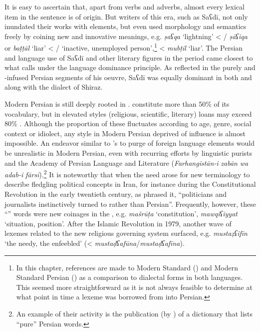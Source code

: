 \documentclass[output=paper]{langsci/langscibook}
\begin{document}
It is easy to ascertain that, apart from verbs and adverbs, almost every lexical item in the sentence is of  origin. But writers of this era, such as Saʕdī, not only inundated their works with  elements, but even used  morphology and semantics freely by coining new and innovative meanings, e.g. \textit{ṣaʕqa} ‘lightning’ < / \textit{ṣāʕiqa} or \textit{baṭṭāl} ‘liar’ < / ‘inactive, unemployed person’,\footnote{In this chapter, references are made to Modern Standard  () and Modern Standard Persian () as a comparison to dialectal forms in both languages. This seemed more straightforward as it is not always feasible to determine at what point in time a lexeme was borrowed from  into Persian.} <  \textit{mubṭil} ‘liar’. The Persian and  language use of Saʕdī and other literary figures in the  period came closest to what \citet{Lucas2015} calls  under the language dominance principle. As reflected in the purely  and -infused Persian segments of his oeuvre, Saʕdī was equally dominant in both   and  along with the dialect of Shiraz.

Modern Persian is still deeply rooted in .   constitute more than 50\% of its vocabulary, but in elevated styles (religious, scientific, literary)  loans may exceed 80\% \citep{Jeremiás2011}. Although the proportion of these  fluctuates according to age, genre, social context or idiolect, any style in Modern Persian deprived of  influence is almost impossible. An endeavor similar to ’s to purge  of foreign language elements would be unrealistic in Modern Persian, even with recurring efforts by linguistic purists and the Academy of Persian Language and Literature (\textit{Farhangistān-i} \textit{zabān} \textit{wa} \textit{adab-i} \textit{fārsī}).\footnote{An example of their activity is the publication (by \citealt{Rāzī2004}) of a dictionary that lists “pure” Persian words.} It is noteworthy that when the need arose for new terminology to describe fledgling political concepts in Iran, for instance during the Constitutional Revolution in the early twentieth\textsuperscript{} century, as \citet{Elwell-Sutton2000} phrased it, “politicians and journalists instinctively turned to  rather than Persian”. Frequently, however, these “” words were new coinages in the , e.g. \textit{mašrūṭa} ‘constitution’, \textit{mawqiʕiyyat} ‘situation, position’. After the Islamic Revolution in 1979, another wave of  lexemes related to the new religious governing system surfaced, e.g. \textit{mustaẓʕifīn} ‘the needy, the enfeebled’ (<  \textit{mustaḍʕafūna}\kern 0.5pt/\kern -1pt\textit{mustaḍʕafīna}).
\end{document}
